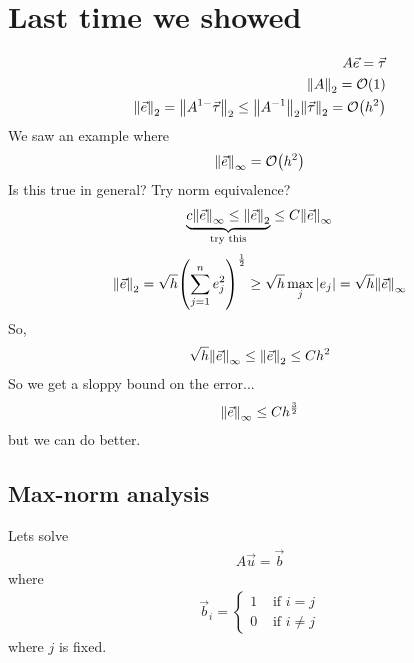 \documentclass{article}
\begin{document}
    \section{Last time we showed}
        \begin{align}
            A\vec{e} = \vec{\tau} \\
            \norm{A}_2 = \order{1} \\
            \norm{\vec{e}}_2 = \norm{A^{1-}\vec{\tau}}_2 \leq \norm{A^{-1}}_2\norm{\vec{\tau}}_2 = \order{h^2}
        \end{align}
        We saw an example where
        \begin{align}
            \norm{\vec{e}}_\infty = \order{h^2}
        \end{align}
        Is this true in general?  Try norm equivalence?
        \begin{align}
            \underbrace{c\norm{\vec{e}}_\infty \leq \norm{\vec{e}}_2}_{\text{try this}} \leq C\norm{\vec{e}}_\infty
        \end{align}
        \begin{align}
            \norm{\vec{e}}_2 = \sqrt{h}\qty(\sum_{j=1}^n e_j^2)^{\frac{1}{2}} \geq \sqrt{h}\max_j\abs{e_j} = \sqrt{h}\norm{\vec{e}}_\infty
        \end{align}
        So,
        \begin{align}
            \sqrt{h}\norm{\vec{e}}_\infty \leq \norm{\vec{e}}_2 \leq Ch^2
        \end{align}
        So we get a sloppy bound on the error...
        \begin{align}
            \norm{\vec{e}}_\infty \leq Ch^{\frac{3}{2}}
        \end{align}
        but we can do better.
        \subsection{Max-norm analysis}
            Lets solve
            \begin{align}
                A\vec{u} = \vec{b}
            \end{align}
            where
            \begin{align}
                \vec{b}_i = \begin{cases}
                    1 & \text{ if } i=j \\
                    0 & \text{ if } i \neq j
                \end{cases}
            \end{align}
            where $j$ is fixed. \\
\end{document}
